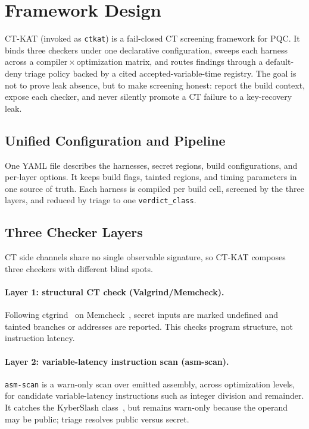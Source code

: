 \section{Framework Design}
\label{sec:design}

CT-KAT (invoked as \texttt{ctkat}) is a fail-closed CT screening framework for
PQC. It binds three checkers under one declarative configuration, sweeps each
harness across a compiler${}\times{}$optimization matrix, and routes findings
through a default-deny triage policy backed by a cited accepted-variable-time
registry.
The goal is not to prove leak absence, but to make screening honest: report the
build context, expose each checker, and never silently promote a CT failure to a
key-recovery leak.

\subsection{Unified Configuration and Pipeline}
\label{ssec:config}

One YAML file describes the harnesses, secret regions, build configurations, and
per-layer options. It keeps build flags, tainted regions, and timing parameters
in one source of truth. Each harness is compiled per build cell, screened by the
three layers, and reduced by triage to one \texttt{verdict\_class}.

\subsection{Three Checker Layers}
\label{ssec:checkers}

CT side channels share no single observable signature, so CT-KAT composes three
checkers with different blind spots.

\paragraph{Layer 1: structural CT check (Valgrind/Memcheck).}
Following ctgrind~\cite{ctgrind} on Memcheck~\cite{valgrind}, secret inputs are
marked undefined and tainted branches or addresses are reported. This checks
program structure, not instruction latency.

\paragraph{Layer 2: variable-latency instruction scan (asm-scan).}
\texttt{asm-scan} is a warn-only scan over emitted assembly, across optimization
levels, for candidate variable-latency instructions such as integer division and
remainder. It catches the KyberSlash class~\cite{kyberslash}, but remains
warn-only because the operand may be public; triage resolves public versus secret.

